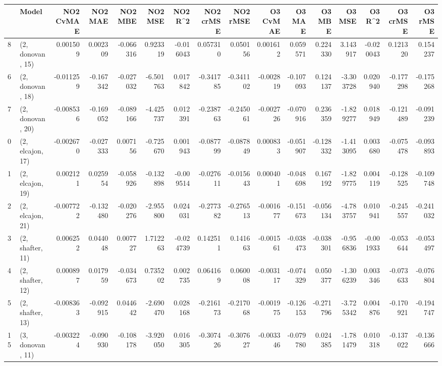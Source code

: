\begin{tabular}{llrrrrrrrrrrrrrr}
\toprule
{} &             Model &  NO2 CvMAE &   NO2 MAE &   NO2 MBE &    NO2 MSE &   NO2 R\textasciicircum2 &  NO2 crMSE &  NO2 rMSE &  O3 CvMAE &    O3 MAE &    O3 MBE &     O3 MSE &    O3 R\textasciicircum2 &  O3 crMSE &   O3 rMSE \\
\midrule
8  &  (2, donovan, 15) &   0.001509 &  0.002309 & -0.066316 &   0.923319 & -0.016043 &   0.057310 &  0.050156 &  0.001612 &  0.059571 &  0.224330 &   3.143917 & -0.020043 &  0.121320 &  0.154237 \\
6  &  (2, donovan, 18) &  -0.011259 & -0.167342 & -0.027032 &  -6.501763 &  0.017842 &  -0.341785 & -0.341102 & -0.002819 & -0.107093 &  0.124137 &  -3.303728 &  0.020940 & -0.177298 & -0.175268 \\
7  &  (2, donovan, 20) &  -0.008536 & -0.169052 & -0.089166 &  -4.425737 &  0.012391 &  -0.238763 & -0.245061 & -0.002726 & -0.070916 &  0.236359 &  -1.829277 &  0.018949 & -0.121489 & -0.091239 \\
0  &  (2, elcajon, 17) &  -0.002670 & -0.027333 &  0.007156 &  -0.725670 &  0.001943 &  -0.087799 & -0.087849 &  0.000833 & -0.051907 & -0.128332 &  -1.413095 &  0.003680 & -0.075478 & -0.093893 \\
1  &  (2, elcajon, 19) &   0.002121 &  0.025954 & -0.058926 &  -0.132898 & -0.009514 &  -0.027611 & -0.015643 &  0.000401 & -0.048698 &  0.167192 &  -1.829775 &  0.004119 & -0.128525 & -0.109748 \\
2  &  (2, elcajon, 21) &  -0.007722 & -0.132480 & -0.020276 &  -2.955800 &  0.024031 &  -0.277382 & -0.276513 & -0.001677 & -0.151673 & -0.056134 &  -4.783757 &  0.010941 & -0.245557 & -0.241032 \\
3  &  (2, shafter, 11) &   0.006252 &  0.044048 &  0.007727 &   1.712263 & -0.024739 &   0.142511 &  0.141663 & -0.001561 & -0.038473 & -0.038301 &  -0.956836 & -0.001933 & -0.053644 & -0.053497 \\
4  &  (2, shafter, 12) &   0.000897 &  0.017959 & -0.034673 &   0.735202 &  0.002735 &   0.064169 &  0.060008 & -0.003117 & -0.074329 &  0.050377 &  -1.306239 &  0.003346 & -0.073633 & -0.076804 \\
5  &  (2, shafter, 13) &  -0.008363 & -0.092915 &  0.044642 &  -2.690470 &  0.028168 &  -0.216173 & -0.217068 & -0.001975 & -0.126153 & -0.271796 &  -3.725342 &  0.004876 & -0.170921 & -0.194747 \\
15 &  (3, donovan, 11) &  -0.003224 & -0.090930 & -0.108178 &  -3.920050 &  0.016305 &  -0.307426 & -0.307627 & -0.003346 & -0.079780 &  0.024385 &  -1.781479 &  0.010318 & -0.137022 & -0.136666 \\

\end{tabular}
